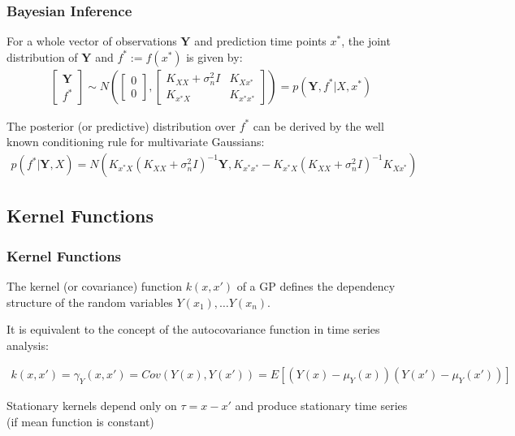 \documentclass[
	8pt, %
]{beamer}
\begin{document}
\begin{frame}
	\frametitle{Bayesian Inference}

	 For a whole vector of observations $\mathbf{Y}$ and prediction time points $x^{\ast}$,
	 the joint distribution of $\mathbf{Y}$ and $f^{\ast} := f(x^{\ast})$ is given by:
	\begin{gather}
		\begin{bmatrix}
			\mathbf{Y} \\
			f^{\ast}
		\end{bmatrix}
		\sim N \left(
			\begin{bmatrix}
			0 \\
			0
			\end{bmatrix},
			\begin{bmatrix}
			K_{XX} + \sigma_n^2 I & K_{Xx^{\ast}} \\
			K_{x^{\ast}X} & K_{x^{\ast}x^{\ast}}
			\end{bmatrix}
			\right)
		= p(\mathbf{Y}, f^{\ast}| X, x^{\ast})
	\end{gather}


	The posterior (or predictive) distribution over $f^{\ast}$ can be derived by the well known conditioning rule for
		multivariate Gaussians:
	\begin{gather}
		p(f^{\ast}| \mathbf{Y}, X) = N(
	K_{x^{\ast}X} (K_{XX} + \sigma_n^2 I)^{-1} \mathbf{Y},
	K_{x^{\ast}x^{\ast}} - K_{x^{\ast}X}(K_{XX} + \sigma_n^2 I)^{-1}K_{Xx^{\ast}})
	\end{gather}

\end{frame}


\subsection{Kernel Functions}

\begin{frame}
	\frametitle{Kernel Functions}


	The kernel (or covariance) function $k(x,x')$ of a GP defines the dependency structure
	of the random variables $Y(x_1), \dots Y(x_n)$.
	\bigskip %

	It is equivalent to the concept of the autocovariance function in time series analysis:

	\begin{gather*}
    k(x, x') = \gamma_Y(x,x') = Cov(Y(x), Y(x')) = E[(Y(x) - \mu_Y(x))(Y(x')-\mu_Y(x'))]
	\end{gather*}

	\bigskip %


	Stationary kernels depend only on $\tau = x-x'$ and produce stationary time series (if mean function is constant)


\end{frame}
\end{document}
